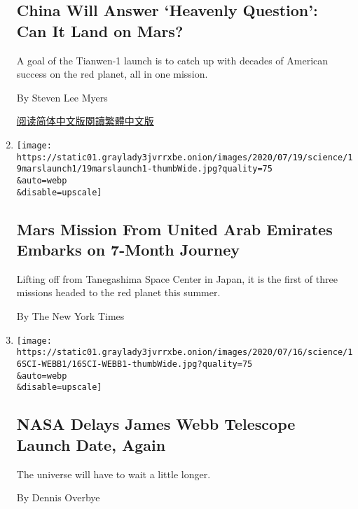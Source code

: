 \begin{enumerate}
{  \subsection{China Will Answer `Heavenly Question': Can It Land on
  Mars?}\label{china-will-answer-heavenly-question-can-it-land-on-mars}}

  A goal of the Tianwen-1 launch is to catch up with decades of American
  success on the red planet, all in one mission.

  By Steven Lee Myers

  \href{https://cn.nytimes3xbfgragh.onion/science/20200723/china-mars-mission/}{阅读简体中文版}\href{https://cn.nytimes3xbfgragh.onion/science/20200723/china-mars-mission/zh-hant/}{閱讀繁體中文版}
\item
  \href{/2020/07/19/science/emirates-mars-mission.html}{}

  \texttt{[image: https://static01.graylady3jvrrxbe.onion/images/2020/07/19/science/19marslaunch1/19marslaunch1-thumbWide.jpg?quality=75\\\&auto=webp\\\&disable=upscale]}

  \hypertarget{mars-mission-from-united-arab-emirates-embarks-on-7-month-journey}{%
  \subsection{Mars Mission From United Arab Emirates Embarks on 7-Month
  Journey}\label{mars-mission-from-united-arab-emirates-embarks-on-7-month-journey}}

  Lifting off from Tanegashima Space Center in Japan, it is the first of
  three missions headed to the red planet this summer.

  By The New York Times
\item
  \href{/2020/07/16/science/nasa-james-webb-space-telescope-delay.html}{}

  \texttt{[image: https://static01.graylady3jvrrxbe.onion/images/2020/07/16/science/16SCI-WEBB1/16SCI-WEBB1-thumbWide.jpg?quality=75\\\&auto=webp\\\&disable=upscale]}

  \hypertarget{nasa-delays-james-webb-telescope-launch-date-again}{%
  \subsection{NASA Delays James Webb Telescope Launch Date,
  Again}\label{nasa-delays-james-webb-telescope-launch-date-again}}

  The universe will have to wait a little longer.

  By Dennis Overbye
\end{enumerate}

